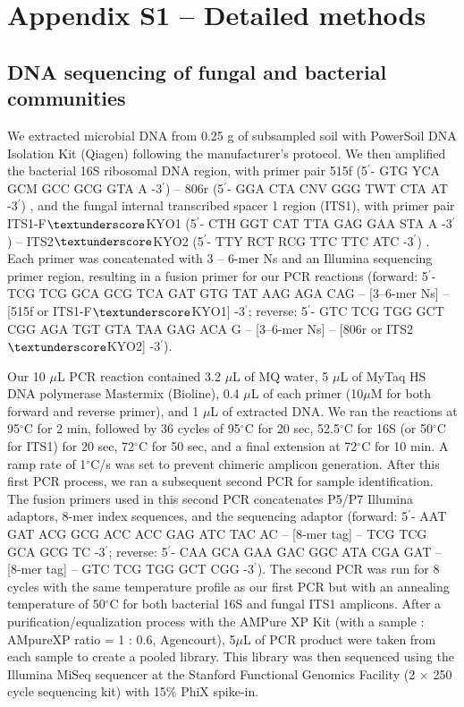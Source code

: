 \section{Appendix S1 -- Detailed methods}
\subsection{DNA sequencing of fungal and bacterial communities}
We extracted microbial DNA from 0.25 g of subsampled soil with PowerSoil DNA Isolation Kit (Qiagen) following the manufacturer's protocol. We then amplified the bacterial 16S ribosomal DNA region, with primer pair 515f (5$^\prime$- GTG YCA GCM GCC GCG GTA A -3$^\prime$) -- 806r (5$^\prime$- GGA CTA CNV GGG TWT CTA AT -3$^\prime$) \citep{Caporaso2012}, and the fungal internal transcribed spacer 1 region (ITS1), with primer pair ITS1-F$\textunderscore$KYO1 (5$^\prime$- CTH GGT CAT TTA GAG GAA STA A -3$^\prime$) -- ITS2$\textunderscore$KYO2 (5$^\prime$- TTY RCT RCG TTC TTC ATC -3$^\prime$) \citep{Toju2012}. Each primer was concatenated with 3 -- 6-mer Ns \citep{Lundberg2013} and an Illumina sequencing primer region, resulting in a fusion primer for our PCR reactions (forward: 5$^\prime$- TCG TCG GCA GCG TCA GAT GTG TAT AAG AGA CAG -- [3--6-mer Ns] -- [515f or ITS1-F$\textunderscore$KYO1] -3$^\prime$; reverse: 5$^\prime$- GTC TCG TGG GCT CGG AGA TGT GTA TAA GAG ACA G -- [3--6-mer Ns] -- [806r or ITS2$\textunderscore$KYO2] -3$^\prime$). 
\par


Our 10 $\mu$L PCR reaction contained 3.2 $\mu$L of MQ water, 5 $\mu$L of MyTaq HS DNA polymerase Mastermix (Bioline), 0.4 $\mu$L of each primer (10$\mu$M for both forward and reverse primer), and 1 $\mu$L of extracted DNA. We ran the reactions at 95$^{\circ}$C for 2 min, followed by 36 cycles of 95$^{\circ}$C for 20 sec, 52.5$^{\circ}$C for 16S (or 50$^{\circ}$C for ITS1) for 20 sec, 72$^{\circ}$C for 50 sec, and a final extension at 72$^{\circ}$C for 10 min. A ramp rate of 1$^{\circ}$C/s was set to prevent chimeric amplicon generation. After this first PCR process, we ran a subsequent second PCR for sample identification. The fusion primers used in this second PCR concatenates P5/P7 Illumina adaptors, 8-mer index sequences, and the sequencing adaptor \citep{Hamady2008} (forward: 5$^\prime$- AAT GAT ACG GCG ACC ACC GAG ATC TAC AC -- [8-mer tag] -- TCG TCG GCA GCG TC -3$^\prime$; reverse: 5$^\prime$- CAA GCA GAA GAC GGC ATA CGA GAT -- [8-mer tag] -- GTC TCG TGG GCT CGG -3$^\prime$). The second PCR was run for 8 cycles with the same temperature profile as our first PCR but with an annealing temperature of 50$^{\circ}$C for both bacterial 16S and fungal ITS1 amplicons. After a purification/equalization process with the AMPure XP Kit (with a sample : AMpureXP ratio = 1 : 0.6, Agencourt), 5$\mu$L of PCR product were taken from each sample to create a pooled library. This library was then sequenced using the Illumina MiSeq sequencer at the Stanford Functional Genomics Facility (2 $\times$ 250 cycle sequencing kit) with 15$\%$ PhiX spike-in.
\par


